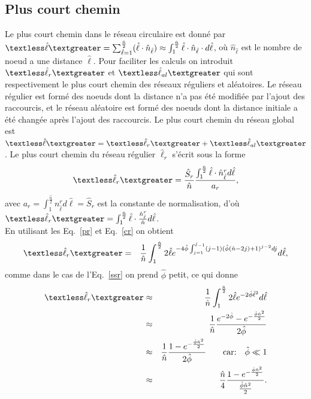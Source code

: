 \subsection{Plus court chemin}
Le plus court chemin dans le réseau circulaire est donné par $\textless \hat{\ell} \textgreater=\sum_{\hat{\ell}=1}^{\frac{\hat{n}}{2}}(\hat{\ell}\cdot \hat{n}_{\hat{\ell}})\approx \int_1^{\frac{\hat n}{2}} \hat{\ell}\cdot \hat{n}_{\hat{\ell}} \cdot d\hat{\ell}$, où $\hat{n}_{\hat{\ell}}$ est le nombre de noeud a une distance $\hat{\ell}$. Pour faciliter les calculs on  introduit  $\textless \hat{\ell}_r \textgreater$ et $\textless\hat{\ell}_{al}\textgreater$ qui sont respectivement le plus court chemin des réseaux réguliers et aléatoires. Le réseau régulier est formé des noeuds dont la distance n'a pas été modifiée par l'ajout des raccourcis, et le réseau aléatoire est formé des noeuds dont la distance initiale a été changée après l'ajout des raccourcis. Le plus court chemin  du réseau global est $\textless \hat{\ell} \textgreater=\textless \hat{\ell}_r \textgreater+ \textless \hat{\ell}_{al} \textgreater$. 
Le plus court chemin du réseau régulier $\hat{\ell}_r$ s'écrit sous la forme 
\begin{equation}
\textless \hat{\ell}_r \textgreater=\frac{\hat{S}_r}{\hat{n}}\frac{\int_1^{\frac{\hat{n}}{2}}\hat{\ell}\cdot \hat{n}_{\hat{\ell}}^{r}d\hat{\ell}}{a_r},
\end{equation}
avec $a_r=\int_1^{\frac{\hat{n}}{2}}n_{\hat{\ell}}^{r}d\hat{\ell}=\hat{S}_r$
est la constante de normalisation, d'où $\textless \hat{\ell}_r \textgreater=\int_1^{\frac{\hat{n}}{2}}\hat{\ell}\cdot\frac{\hat{n}_{\hat{\ell}}^{r}}{\hat{n}}d\hat{\ell}$.\\
En utilisant les  Eq.~\eqref{pr} et Eq.~\eqref{cr} on obtient
\begin{eqnarray}
\textless \hat{\ell}_r \textgreater&=&\frac{1}{\hat{n}}\int^{\frac{\hat{n}}{2}}_1 2\hat{\ell}e^{-4\hat{\phi}\int_{j=1}^{\hat{\ell}-1}(j-1)(\hat{\phi}(\hat{n}-2j)+1)^{j-2}dj}d\hat{\ell},\nonumber
\end{eqnarray}
comme dans le cas de l'Eq.~\eqref{ssr} on prend $\hat{\phi}$ petit, ce qui donne 
\begin{eqnarray}\nonumber
\textless \hat{\ell}_r \textgreater &\approx&\frac{1}{\hat{n}}\int_1^{\frac{\hat{n}}{2}}2\hat{\ell}e^{-2\hat{\phi}\hat{\ell}^2}d\hat{\ell} \\\nonumber
&\approx&\frac{1}{\hat{n}}\frac{e^{-2\hat{\phi}}-e^{-\frac{\hat{\phi}\hat{n}^2}{2}}}{2\hat{\phi}}\\\nonumber
&\approx&\frac{1}{\hat{n}}\frac{1-e^{-\frac{\hat{\phi}\hat{n}^2}{2}}}{2\hat{\phi}} \quad \quad  \text{car:} \quad \hat{\phi}\ll1 \\
&\approx&\frac{\hat{n}}{4}\frac{1-e^{-\frac{\hat{\phi}\hat{n}^2}{2}}}{\frac{\hat{\phi}\hat{n}^2}{2}}.
\end{eqnarray}
